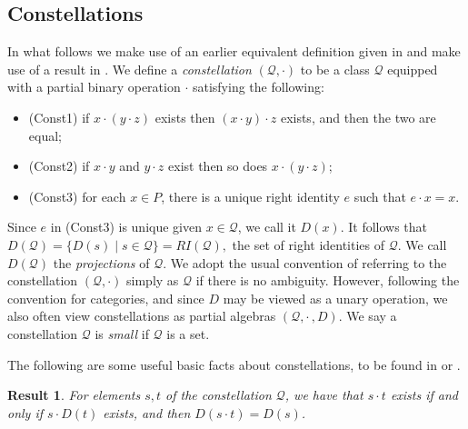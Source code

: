 \documentclass[12pt]{amsart}
\newtheorem{result}[thm]{Result}
\theoremstyle{definition}
\newcommand{\bi}{\begin{itemize}}
\newcommand{\ei}{\end{itemize}}
\newcommand{\Q}{\mathcal Q}
\begin{document}
\subsection{Constellations}

In what follows we make use of an earlier equivalent definition given in \cite{constell} and  make use of a result in \cite{constgen}. We define a \emph{constellation} $(\Q,\cdot)$  to be a class $\Q$ equipped with a partial binary operation $\cdot$ satisfying the following:
\bi
\item[] (Const1) if $x\cdot(y\cdot z)$ exists then $(x\cdot y)\cdot z$ exists, and then the two are equal;
\item[] (Const2) if $x\cdot y$ and $y\cdot z$ exist then so does $x\cdot(y\cdot z)$;
\item[] (Const3) for each $x\in P$, there is a unique right identity $e$ such that $e\cdot x=x$.
\ei
Since $e$ in (Const3) is unique given $x\in \Q$, we call it $D(x)$.  
It follows that $D(\Q)=\{D(s)\mid s\in \Q\}=RI(\Q),$ the set of right identities of $\Q$.  We call $D(\Q)$ the {\em projections} of $\Q$.  We adopt the usual convention of referring to the constellation $(\Q,\cdot)$ simply as $\Q$ if there is no ambiguity. However, following the convention for categories, and since $D$ may be viewed as a unary operation, we also often view constellations as partial algebras $(\Q,\cdot\, ,D)$.      We say a constellation $\Q$ is {\em small} if $\Q$ is a set.

The following are some useful basic facts about constellations, to be found in \cite{constell} or \cite{constgen}.

\begin{result}  \label{2p3}
For elements $s,t$ of the constellation $\Q$, we have that $s\cdot t$ exists if and only if $s\cdot D(t)$ exists, and then $D(s\cdot t)=D(s)$.
\end{result}
\end{document}
